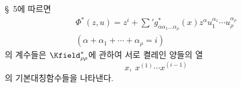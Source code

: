 
\S\ 5에 따르면
\[
\begin{gathered}
\Phi^*(z,u)=z^i+\sum{}'g^*_{\alpha\alpha_1\ldots\alpha_\rho}(x)z^\alpha u_1^{\alpha_1}\cdots u_\rho^{\alpha_\rho}\\
(\alpha+\alpha_1+\cdots+\alpha_\rho=i)
\end{gathered}
\]
의 계수들은 $\Kfield^*_{\rho\rho}$에 관하여 서로 켤레인 양들의 열
\[
x,\ x^{(1)}\cdots x^{(i-1)}
\]
의 기본대칭함수들을 나타낸다.
